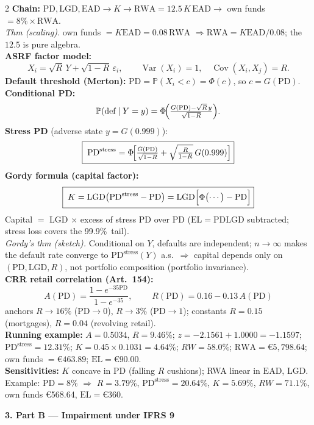 \documentclass[10pt,a4paper]{report}
\renewcommand{\EUR}[1]{\euro#1}
\newcommand{\PD}{\mathrm{PD}}
\newcommand{\LGD}{\mathrm{LGD}}
\newcommand{\EAD}{\mathrm{EAD}}
\newcommand{\RWA}{\mathrm{RWA}}
\newcommand{\EL}{\mathrm{EL}}
\newcommand{\Var}{\operatorname{Var}}
\newcommand{\sect}[1]{\vspace{1.2mm}\textcolor{ceruleanlink}{\textbf{#1}}\par\vspace{0.3mm}}
\newcommand{\mini}[1]{\textbf{\small #1}}
\begin{document}
\begin{multicols}{2}
\mini{Chain:} $\PD,\LGD,\EAD \to K \to \RWA=12.5\,K\,\EAD \to$
own funds $=8\%\times\RWA$.\\
\emph{Thm (scaling).} own funds $=K\EAD=0.08\,\RWA$
$\Rightarrow \RWA=K\EAD/0.08$; the $12.5$ is pure algebra.\\
\mini{ASRF factor model:}
\[
X_i=\sqrt{R}\,Y+\sqrt{1-R}\,\varepsilon_i,\qquad
\Var(X_i)=1,\quad \operatorname{Cov}(X_i,X_j)=R .
\]
\mini{Default threshold (Merton):} $\PD=\mathbb P(X_i<c)=\Phi(c)$, so
$c=G(\PD)$.\\
\mini{Conditional PD:}
\[
\mathbb P(\text{def}\mid Y=y)
=\Phi\!\Bigl(\tfrac{G(\PD)-\sqrt R\,y}{\sqrt{1-R}}\Bigr).
\]
\mini{Stress PD} (adverse state $y=G(0.999)$):
\[
\boxed{\;\PD^{\mathrm{stress}}
=\Phi\!\Bigl[\tfrac{G(\PD)}{\sqrt{1-R}}
+\sqrt{\tfrac{R}{1-R}}\,G(0.999)\Bigr]}
\]
\mini{Gordy formula (capital factor):}
\[
\boxed{\;K=\LGD\bigl(\PD^{\mathrm{stress}}-\PD\bigr)
=\LGD\Bigl[\Phi\bigl(\cdots\bigr)-\PD\Bigr]}
\]
Capital $=$ LGD $\times$ excess of stress PD over PD
($\EL=\PD\LGD$ subtracted; stress loss covers the 99.9\%\ tail).\\
\emph{Gordy's thm (sketch).} Conditional on $Y$, defaults are
independent; $n\to\infty$ makes the default rate converge to
$\PD^{\mathrm{stress}}(Y)$ a.s.\ $\Rightarrow$ capital depends only on
$(\PD,\LGD,R)$, not portfolio composition (portfolio invariance).\\
\mini{CRR retail correlation (Art.~154):}
\[
A(\PD)=\frac{1-e^{-35\PD}}{1-e^{-35}},\qquad
\boxed{\;R(\PD)=0.16-0.13\,A(\PD)}
\]
anchors $R\to16\%$ ($\PD\to0$), $R\to3\%$ ($\PD\to1$);
constants $R=0.15$ (mortgages), $R=0.04$ (revolving retail).\\
\mini{Running example:}
$A=0.5034$, $R=9.46\%$;\;
$z=-2.1561+1.0000=-1.1597$;\;
$\PD^{\mathrm{stress}}=12.31\%$;\;
$K=0.45\times0.1031=4.64\%$;\;
$RW=58.0\%$;\;
$\RWA=\EUR{5{,}798.64}$;\;
own funds $=\EUR{463.89}$;\;
$\EL=\EUR{90.00}$.\\
\mini{Sensitivities:} $K$ concave in $\PD$ (falling $R$ cushions);
RWA linear in $\EAD$, $\LGD$. Example: $\PD=8\%$ $\Rightarrow$
$R=3.79\%$, $\PD^{\mathrm{stress}}=20.64\%$, $K=5.69\%$,
$RW=71.1\%$, own funds \EUR{568.64}, $\EL=\EUR{360}$.

\sect{3. Part B --- Impairment under IFRS 9}


\end{multicols}
\end{document}
